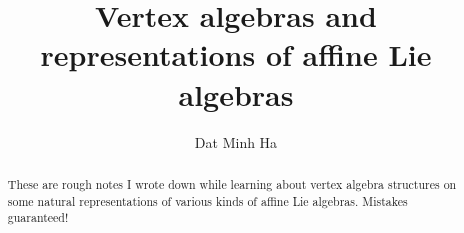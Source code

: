 

\setcounter{section}{-1}


\newcommand{\simpleroots}{\mathbb{I}}



    \title{Vertex algebras and representations of affine Lie algebras}
    
    \author{Dat Minh Ha}
    \maketitle
    
    \begin{abstract}
        These are rough notes I wrote down while learning about vertex algebra structures on some natural representations of various kinds of affine Lie algebras. Mistakes guaranteed!
    \end{abstract}
    
    {
    \hypersetup{} 
    \tableofcontents %
    }

    

    

    

    

    

    

    \begin{appendices}
        
    
        
    \end{appendices}
    
    \printbibliography

